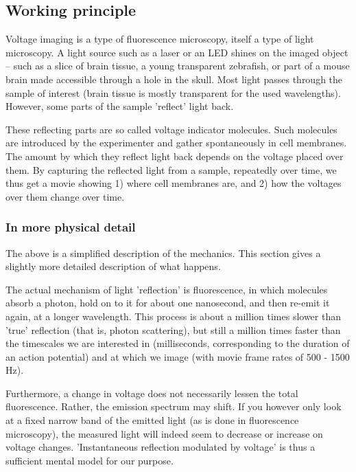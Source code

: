 \subsection{Working principle}

Voltage imaging is a type of fluorescence microscopy, itself a type of light microscopy. A light source such as a laser or an LED shines on the imaged object -- such as a slice of brain tissue, a young transparent zebrafish, or part of a mouse brain made accessible through a hole in the skull. Most light passes through the sample of interest (brain tissue is mostly transparent for the used wavelengths). However, some parts of the sample 'reflect' light back.

These reflecting parts are so called voltage indicator molecules. Such molecules are introduced by the experimenter and gather spontaneously in cell membranes. The amount by which they reflect light back depends on the voltage placed over them. By capturing the reflected light from a sample, repeatedly over time, we thus get a movie showing 1) where cell membranes are, and 2) how the voltages over them change over time.

\subsubsection{In more physical detail}
The above is a simplified description of the mechanics. This section gives a slightly more detailed description of what happens.

The actual mechanism of light 'reflection' is fluorescence, in which molecules absorb a photon, hold on to it for about one nanosecond, and then re-emit it again, at a longer wavelength. This process is about a million times slower than 'true' reflection (that is, photon scattering), but still a million times faster than the timescales we are interested in (milliseconds, corresponding to the duration of an action potential) and at which we image (with movie frame rates of 500 - 1500 Hz).\cite{Valeur2012MolecularFluorescencePrinciples,Cox2019FundamentalsFluorescenceImaging}

Furthermore, a change in voltage does not necessarily lessen the total fluorescence. Rather, the emission spectrum may shift. If you however only look at a fixed narrow band of the emitted light (as is done in fluorescence microscopy), the measured light will indeed seem to decrease or increase on voltage changes.
'Instantaneous reflection modulated by voltage' is thus a sufficient mental model for our purpose.

